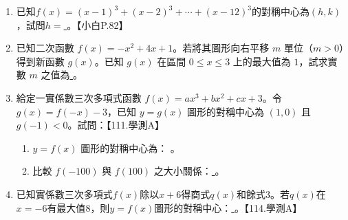 \documentclass[b4paper,12pt]{exam}
\newif\ifshowAnswer
\newcommand{\colorAnswer}[2]{%
{
  \makebox[6em][c]{%
    \ifshowAnswer
      {\color{#1}#2}%
    \else
      \phantom{#2}%
    \fi
  }}%
}
\begin{document}
\begin{enumerate}[itemsep=1em, topsep=1em]
    \item 已知$f(x)=(x-1)^3+(x-2)^3+\cdots+(x-12)^3$的對稱中心為$(h,k)$，試問$h=$\underline{\colorAnswer{red}{$?$}}。【小白P.82】

    \item 已知二次函數 $f(x)=-x^2+4x+1$。若將其圖形向右平移 $m$ 單位（$m>0$）得到新函數 $g(x)$。已知 $g(x)$ 在區間 $0\leq x\leq3$ 上的最大值為 $1$，試求實數 $m$ 之值為\underline{\colorAnswer{red}{$?$}}。

    \item 給定一實係數三次多項式函數 $f(x) = ax^3 + bx^2 + cx + 3$。令 $g(x)=f(-x)-3$，已知 $y=g(x)$ 圖形的對稱中心為 $(1, 0)$ 且 $g(-1)<0$。試問：【111.學測A】
        \begin{enumerate}[label=(\arabic*)]
            \item $y = f(x)$ 圖形的對稱中心為： \underline{\colorAnswer{red}{$?$}}。
            \item 比較 $f(-100)$ 與 $f(100)$ 之大小關係：\underline{\colorAnswer{red}{$?$}}。
        \end{enumerate}

    \item 已知實係數三次多項式$f(x)$除以$x+6$得商式$q(x)$和餘式$3$。若$q(x)$在$x=−6$有最大值$8$，則$y=f(x)$圖形的對稱中心：\underline{\colorAnswer{red}{$?$}}。【114.學測A】
    

        
\end{enumerate}
\end{document}
